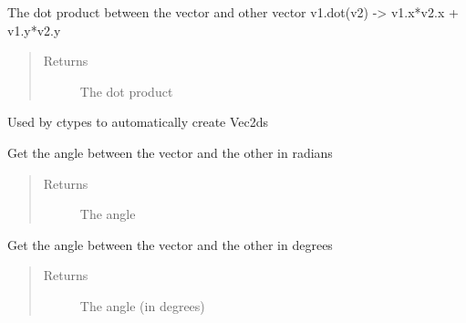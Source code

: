 \documentclass[letterpaper,10pt,english]{sphinxmanual}
\begin{document}
\begin{fulllineitems}
\begin{fulllineitems}
\begin{quote}
\begin{description}
\end{description}\end{quote}

\end{fulllineitems}


\begin{fulllineitems}
\label{geometry:serge.simplevecs.Vec2d.dot}
The dot product between the vector and other vector
v1.dot(v2) -\textgreater{} v1.x*v2.x + v1.y*v2.y
\begin{quote}\begin{description}
\item[{Returns}] \leavevmode
The dot product

\end{description}\end{quote}

\end{fulllineitems}


\begin{fulllineitems}
\label{geometry:serge.simplevecs.Vec2d.from_param}
Used by ctypes to automatically create Vec2ds

\end{fulllineitems}


\begin{fulllineitems}
\label{geometry:serge.simplevecs.Vec2d.get_angle_between}
Get the angle between the vector and the other in radians
\begin{quote}\begin{description}
\item[{Returns}] \leavevmode
The angle

\end{description}\end{quote}

\end{fulllineitems}


\begin{fulllineitems}
\label{geometry:serge.simplevecs.Vec2d.get_angle_degrees_between}
Get the angle between the vector and the other in degrees
\begin{quote}\begin{description}
\item[{Returns}] \leavevmode
The angle (in degrees)


\end{description}
\end{quote}
\end{fulllineitems}
\end{fulllineitems}
\end{document}

